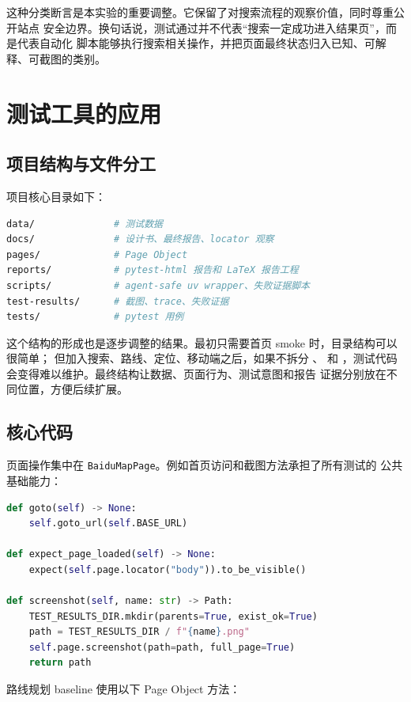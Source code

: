 \documentclass[UTF8,a4paper,12pt]{ctexart}
\begin{document}
这种分类断言是本实验的重要调整。它保留了对搜索流程的观察价值，同时尊重公开站点
安全边界。换句话说，测试通过并不代表“搜索一定成功进入结果页”，而是代表自动化
脚本能够执行搜索相关操作，并把页面最终状态归入已知、可解释、可截图的类别。

\section{测试工具的应用}

\subsection{项目结构与文件分工}

项目核心目录如下：

\begin{lstlisting}[language=bash]
data/              # 测试数据
docs/              # 设计书、最终报告、locator 观察
pages/             # Page Object
reports/           # pytest-html 报告和 LaTeX 报告工程
scripts/           # agent-safe uv wrapper、失败证据脚本
test-results/      # 截图、trace、失败证据
tests/             # pytest 用例
\end{lstlisting}

这个结构的形成也是逐步调整的结果。最初只需要首页 smoke 时，目录结构可以很简单；
但加入搜索、路线、定位、移动端之后，如果不拆分 、 和
，测试代码会变得难以维护。最终结构让数据、页面行为、测试意图和报告
证据分别放在不同位置，方便后续扩展。

\subsection{核心代码}

页面操作集中在 \texttt{BaiduMapPage}。例如首页访问和截图方法承担了所有测试的
公共基础能力：

\begin{lstlisting}[language=Python]
def goto(self) -> None:
    self.goto_url(self.BASE_URL)

def expect_page_loaded(self) -> None:
    expect(self.page.locator("body")).to_be_visible()

def screenshot(self, name: str) -> Path:
    TEST_RESULTS_DIR.mkdir(parents=True, exist_ok=True)
    path = TEST_RESULTS_DIR / f"{name}.png"
    self.page.screenshot(path=path, full_page=True)
    return path
\end{lstlisting}

路线规划 baseline 使用以下 Page Object 方法：
\end{document}
